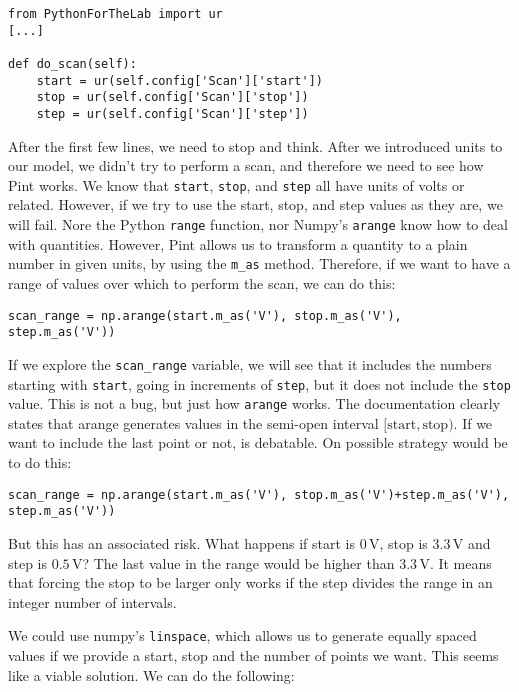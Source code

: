 \begin{verbatim}
from PythonForTheLab import ur
[...]

def do_scan(self):
    start = ur(self.config['Scan']['start'])
    stop = ur(self.config['Scan']['stop'])
    step = ur(self.config['Scan']['step'])
\end{verbatim}

After the first few lines, we need to stop and think. After we introduced units to our model, we didn't try to perform a scan, and therefore we need to see how Pint works. We know that \texttt{start}, \texttt{stop}, and \texttt{step} all have units of volts or related. However, if we try to use the start, stop, and step values as they are, we will fail. Nore the Python \texttt{range} function, nor Numpy's \texttt{arange} know how to deal with quantities. However, Pint allows us to transform a quantity to a plain number in given units, by using the \texttt{m\_as} method. Therefore, if we want to have a range of values over which to perform the scan, we can do this:

\begin{verbatim}
scan_range = np.arange(start.m_as('V'), stop.m_as('V'), step.m_as('V'))
\end{verbatim}

If we explore the \texttt{scan\_range} variable, we will see that it includes the numbers starting with \texttt{start}, going in increments of \texttt{step}, but it does not include the \texttt{stop} value. This is not a bug, but just how \texttt{arange} works. The documentation clearly states that arange generates values in the semi-open interval $[\textrm{start}, \textrm{stop})$. If we want to include the last point or not, is debatable. On possible strategy would be to do this:

\begin{verbatim}
scan_range = np.arange(start.m_as('V'), stop.m_as('V')+step.m_as('V'), step.m_as('V'))
\end{verbatim}

But this has an associated risk. What happens if start is $0\,\textrm{V}$, stop is $3.3\,\textrm{V}$ and step is $0.5\,\textrm{V}$? The last value in the range would be higher than $3.3\,\textrm{V}$. It means that forcing the stop to be larger only works if the step divides the range in an integer number of intervals.

We could use numpy's \texttt{linspace}, which allows us to generate equally spaced values if we provide a start, stop and the number of points we want. This seems like a viable solution. We can do the following:

